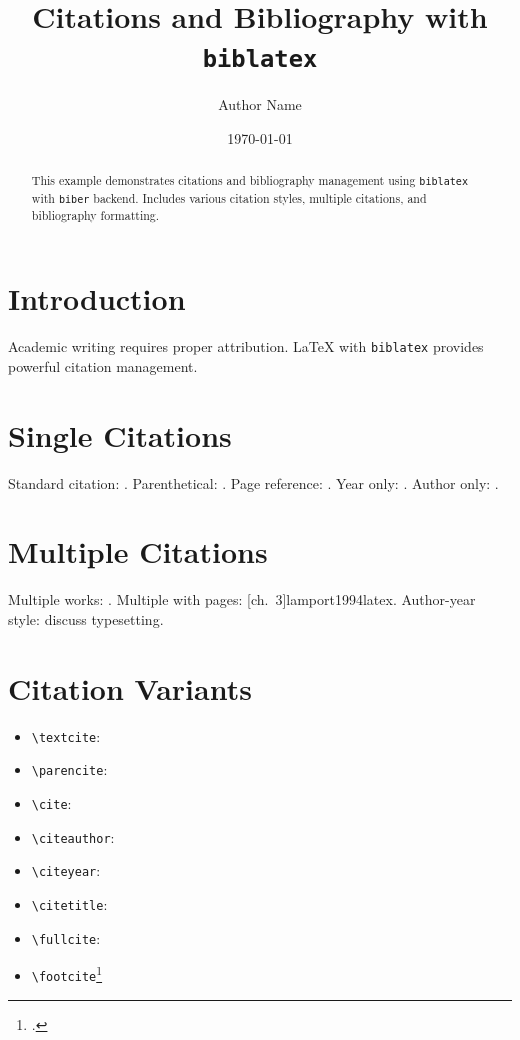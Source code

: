 \documentclass[12pt,a4paper]{article}
\title{Citations and Bibliography with \texttt{biblatex}}
\author{Author Name}
\date{\today}
\begin{document}
\maketitle

\begin{abstract}
This example demonstrates citations and bibliography management using
\texttt{biblatex} with \texttt{biber} backend. Includes various citation
styles, multiple citations, and bibliography formatting.
\end{abstract}

\section{Introduction}\label{sec:intro}
Academic writing requires proper attribution. \LaTeX{} with \texttt{biblatex}
provides powerful citation management.

\section{Single Citations}\label{sec:single}
Standard citation: \textcite{knuth1984texbook}.
Parenthetical: \parencite{knuth1984texbook}.
Page reference: \parencite[pp.~123--125]{knuth1984texbook}.
Year only: \citeyear{knuth1984texbook}.
Author only: \citeauthor{knuth1984texbook}.

\section{Multiple Citations}\label{sec:multiple}
Multiple works: \parencite{knuth1984texbook,lamport1994latex,goossens1994companion}.
Multiple with pages: \parencite[pp.~10--15]{knuth1984texbook}[ch.~3]{lamport1994latex}.
Author-year style: \textcite{knuth1984texbook,lamport1994latex} discuss typesetting.

\section{Citation Variants}\label{sec:variants}
\begin{itemize}
    \item \texttt{\textbackslash textcite}: \textcite{knuth1984texbook}
    \item \texttt{\textbackslash parencite}: \parencite{knuth1984texbook}
    \item \texttt{\textbackslash cite}: \cite{knuth1984texbook}
    \item \texttt{\textbackslash citeauthor}: \citeauthor{knuth1984texbook}
    \item \texttt{\textbackslash citeyear}: \citeyear{knuth1984texbook}
    \item \texttt{\textbackslash citetitle}: 
    \item \texttt{\textbackslash fullcite}: 
    \item \texttt{\textbackslash footcite}\footcite{knuth1984texbook}
\end{itemize}
\end{document}
